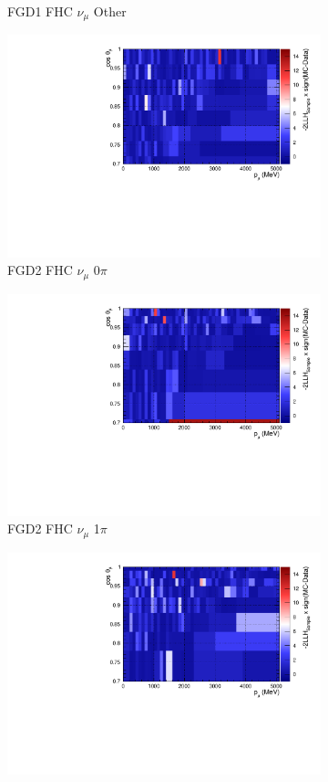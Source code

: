 \begin{figure}[!htbp]
\begin{subfigure}{.32\textwidth}
  \caption{FGD1 FHC $\nu_{\mu}$ Other}
  \label{fig:llhcont_FGD1_numuCC_other}
\end{subfigure}
\centering
\begin{subfigure}{.32\textwidth}
  \centering
  \includegraphics[width=0.85\linewidth]{figs/llhcont_Poly574_FGD2_numuCC_0pi.pdf}
  \caption{FGD2 FHC $\nu_{\mu}$ 0$\pi$}
  \label{fig:llhcont_FGD2_numuCC_0pi}
\end{subfigure}
\begin{subfigure}{.32\textwidth}
  \centering
  \includegraphics[width=0.85\linewidth]{figs/llhcont_Poly574_FGD2_numuCC_1pi.pdf}
  \caption{FGD2 FHC $\nu_{\mu}$ 1$\pi$}
  \label{fig:llhcont_FGD2_numuCC_1pi}
\end{subfigure}
\begin{subfigure}{.32\textwidth}
  \centering
  \includegraphics[width=0.85\linewidth]{figs/llhcont_Poly574_FGD2_numuCC_other.pdf}

\end{subfigure}
\end{figure}
